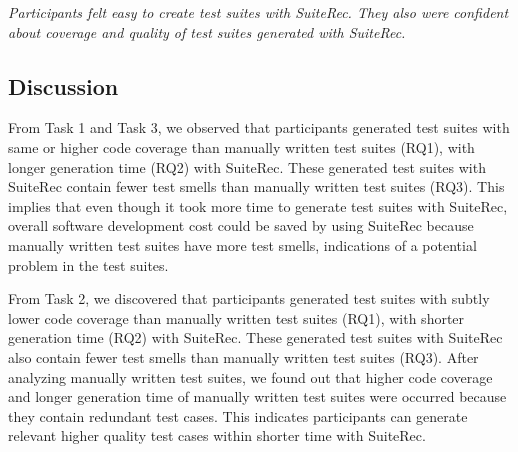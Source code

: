 \documentclass[conference]{IEEEtran}
\begin{document}
\begin{breakbox}
\textit{Participants felt easy to create test suites with \textsf{SuiteRec}. They also were confident about coverage and quality of test suites generated with \textsf{SuiteRec}.}
\end{breakbox}

\subsection{Discussion}
From Task 1 and Task 3, we observed that participants generated test suites with same or higher code coverage than manually written test suites (RQ1), with longer generation time (RQ2) with \textsf{SuiteRec}. These generated test suites with \textsf{SuiteRec} contain fewer test smells than manually written test suites (RQ3). This implies that even though it took more time to generate test suites with \textsf{SuiteRec}, overall software development cost could be saved by using \textsf{SuiteRec} because manually written test suites have more test smells, indications of a potential problem in the test suites. 

From Task 2, we discovered that participants generated test suites with subtly lower code coverage than manually written test suites (RQ1), with shorter generation time (RQ2) with \textsf{SuiteRec}. These generated test suites with \textsf{SuiteRec} also contain fewer test smells than manually written test suites (RQ3). After analyzing manually written test suites, we found out that higher code coverage and longer generation time of manually written test suites were occurred because they contain redundant test cases. This indicates participants can generate relevant higher quality test cases within shorter time with \textsf{SuiteRec}.

\end{document}
